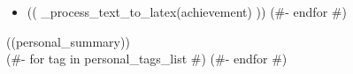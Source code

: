 \documentclass[10pt,a4paper,ragged2e,withhyper]{altacv}
\begin{document}
\begin{paracol}{2}
    \smallskip
    \begin{itemize}
        (#- for achievement in achievements_list #)
            \item (( _process_text_to_latex(achievement) ))
        (#- endfor #)
    \end{itemize}
    \medskip

    \smallskip
    ((personal_summary))\\
     (#- for tag in personal_tags_list #)  (#- endfor #)


  \end{paracol}
\end{document}
